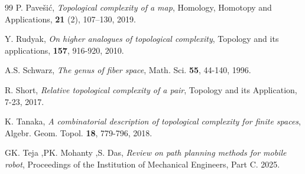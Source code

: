 \documentclass[preprint,11pt %
]{hjm1}
\theoremstyle{definition}
\begin{document}
\begin{thebibliography}{99}
P. Pave{\v{s}}i{\'c}, {\it Topological complexity of a map},
{Homology, Homotopy and Applications}, {\bf 21} (2), 107--130, 2019.



Y. Rudyak, \textit{On higher analogues of topological complexity}, Topology and its applications, {\bf 157}, 916-920, 2010.

A.S. Schwarz, \textit{The genus of fiber space}, Math. Sci. {\bf 55}, 44-140, 1996. 

R. Short, \textit{Relative topological complexity of a pair}, Topology and its Application, 7-23, 2017.

K. Tanaka, \textit{ A combinatorial description of topological complexity for finite spaces}, Algebr. Geom. Topol. {\bf 18}, 779-796, 2018.

GK. Teja ,PK.  Mohanty ,S. Das, {\it Review on path planning methods for mobile robot}, { Proceedings of the Institution of Mechanical Engineers}, Part C. 2025.








%

\end{thebibliography}




\end{document}
